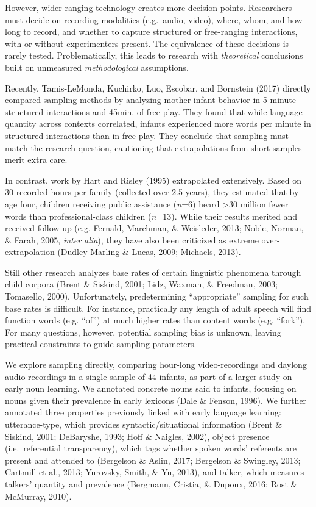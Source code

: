\documentclass[man]{apa6}
\theoremstyle{definition}
\theoremstyle{definition}
\theoremstyle{definition}
\theoremstyle{remark}
\begin{document}
However, wider-ranging technology creates more decision-points.
Researchers must decide on recording modalities (e.g.~audio, video),
where, whom, and how long to record, and whether to capture structured
or free-ranging interactions, with or without experimenters present. The
equivalence of these decisions is rarely tested. Problematically, this
leads to research with \emph{theoretical} conclusions built on
unmeasured \emph{methodological} assumptions.

Recently, Tamis-LeMonda, Kuchirko, Luo, Escobar, and Bornstein (2017)
directly compared sampling methods by analyzing mother-infant behavior
in 5-minute structured interactions and 45min. of free play. They found
that while language quantity across contexts correlated, infants
experienced more words per minute in structured interactions than in
free play. They conclude that sampling must match the research question,
cautioning that extrapolations from short samples merit extra care.

In contrast, work by Hart and Risley (1995) extrapolated extensively.
Based on 30 recorded hours per family (collected over 2.5 years), they
estimated that by age four, children receiving public assistance
(\emph{n}=6) heard \textgreater{}30 million fewer words than
professional-class children (\emph{n}=13). While their results merited
and received follow-up (e.g. Fernald, Marchman, \& Weisleder, 2013;
Noble, Norman, \& Farah, 2005, \emph{inter alia}), they have also been
criticized as extreme over-extrapolation (Dudley-Marling \& Lucas, 2009;
Michaels, 2013).

Still other research analyzes base rates of certain linguistic phenomena
through child corpora (Brent \& Siskind, 2001; Lidz, Waxman, \&
Freedman, 2003; Tomasello, 2000). Unfortunately, predetermining
\enquote{appropriate} sampling for such base rates is difficult. For
instance, practically any length of adult speech will find function
words (e.g. \enquote{of}) at much higher rates than content words (e.g.
\enquote{fork}). For many questions, however, potential sampling bias is
unknown, leaving practical constraints to guide sampling parameters.

We explore sampling directly, comparing hour-long video-recordings and
daylong audio-recordings in a single sample of 44 infants, as part of a
larger study on early noun learning. We annotated concrete nouns said to
infants, focusing on nouns given their prevalence in early lexicons
(Dale \& Fenson, 1996). We further annotated three properties previously
linked with early language learning: utterance-type, which provides
syntactic/situational information (Brent \& Siskind, 2001; DeBaryshe,
1993; Hoff \& Naigles, 2002), object presence (i.e.~referential
transparency), which tags whether spoken words' referents are present
and attended to (Bergelson \& Aslin, 2017; Bergelson \& Swingley, 2013;
Cartmill et al., 2013; Yurovsky, Smith, \& Yu, 2013), and talker, which
measures talkers' quantity and prevalence (Bergmann, Cristia, \& Dupoux,
2016; Rost \& McMurray, 2010).
\end{document}
